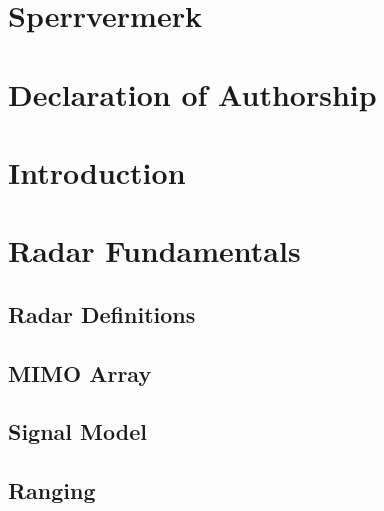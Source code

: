 \documentclass[DIV=15,
fleqn
numbers=noenddot,
headsepline,
captions=tableabove,twoside, openright]{scrreprt}
\begin{document}


\chapter*{Sperrvermerk}

\chapter*{Declaration of Authorship}
\chapter*{}
\vspace*{8cm}
\thispagestyle{empty}

\tableofcontents	
\chapter{Introduction}
	\pagestyle{scrheadings}
	\clearscrheadfoot
	\ihead{\headmark}
	\ohead{\pagemark}

\chapter{Radar Fundamentals}\label{ch:basics}

\section{Radar Definitions}\label{bs:definitions}
 
 \section{MIMO Array}\label{bs:MIMO}
 
\section{Signal Model}\label{bs:signal}


\section{Ranging}\label{bs:ranging}
\end{document}
